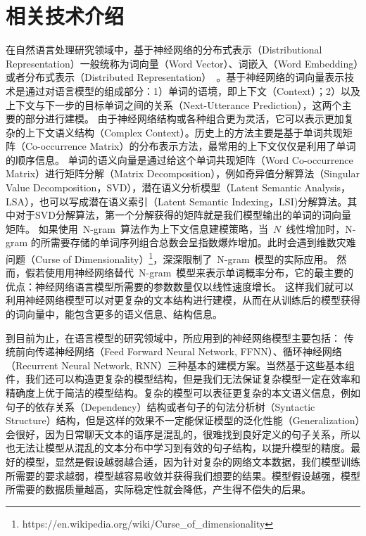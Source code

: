 \chapter{相关技术介绍}
在自然语言处理研究领域中，基于神经网络的分布式表示（Distributional Representation）一般统称为词向量（Word Vector）、词嵌入（Word Embedding）或者分布式表示（Distributed Representation）~。基于神经网络的词向量表示技术是通过对语言模型的组成部分：1）单词的语境，即上下文（Context）；2）以及上下文与下一步的目标单词之间的关系（Next-Utterance Prediction），这两个主要的部分进行建模。
由于神经网络结构或各种组合更为灵活，它可以表示更加复杂的上下文语义结构（Complex Context）。历史上的方法主要是基于单词共现矩阵（Co-occurrence Matrix）的分布表示方法，最常用的上下文仅仅是利用了单词的顺序信息。
单词的语义向量是通过给这个单词共现矩阵（Word Co-occurrence Matrix）进行矩阵分解（Matrix Decomposition），例如奇异值分解算法（Singular Value Decomposition，SVD），潜在语义分析模型（Latent Semantic Analysis，LSA），也可以写成潜在语义索引（Latent Semantic Indexing，LSI)分解算法。其中对于SVD分解算法，第一个分解获得的矩阵就是我们模型输出的单词的词向量矩阵。
如果使用~N-gram~算法作为上下文信息建模策略，当~$N$~线性增加时，N-gram 的所需要存储的单词序列组合总数会呈指数爆炸增加。此时会遇到维数灾难问题（Curse of Dimensionality）\footnote{https://en.wikipedia.org/wiki/Curse\_of\_dimensionality}，深深限制了~N-gram~模型的实际应用。
然而，假若使用用神经网络替代~N-gram~模型来表示单词概率分布，它的最主要的优点：神经网络语言模型所需要的参数数量仅以线性速度增长。
这样我们就可以利用神经网络模型可以对更复杂的文本结构进行建模，从而在从训练后的模型获得的词向量中，能包含更多的语义信息、结构信息。

到目前为止，在语言模型的研究领域中，所应用到的神经网络模型主要包括： 传统前向传递神经网络（Feed Forward Neural Network, FFNN）、循环神经网络（Recurrent Neural Network, RNN）三种基本的建模方案。当然基于这些基本组件，我们还可以构造更复杂的模型结构，但是我们无法保证复杂模型一定在效率和精确度上优于简洁的模型结构。复杂的模型可以表征更复杂的本文语义信息，例如句子的依存关系（Dependency）结构或者句子的句法分析树（Syntactic Structure）结构，但是这样的效果不一定能保证模型的泛化性能（Generalization）会很好，因为日常聊天文本的语序是混乱的，很难找到良好定义的句子关系，所以也无法让模型从混乱的文本分布中学习到有效的句子结构，以提升模型的精度。最好的模型，显然是假设越弱越合适，因为针对复杂的网络文本数据，我们模型训练所需要的要求越弱，模型越容易收敛并获得我们想要的结果。模型假设越强，模型所需要的数据质量越高，实际稳定性就会降低，产生得不偿失的后果。

